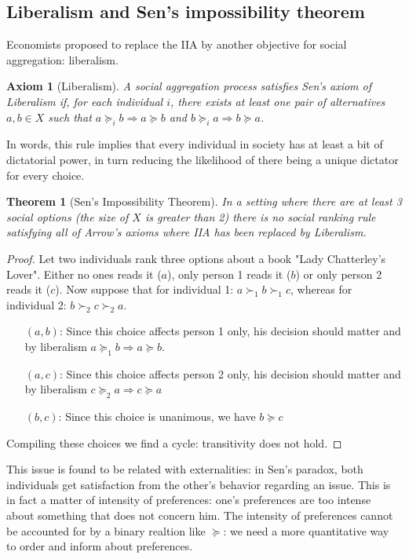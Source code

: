 \documentclass[12pt]{report}
\newtheorem{theorem}{Theorem}[chapter]
\newtheorem{axiom}{Axiom}[chapter]
\begin{document}
\subsection{Liberalism and Sen's impossibility theorem} 

Economists proposed to replace the IIA by another objective for social aggregation: liberalism.

\begin{axiom}[Liberalism] 
A social aggregation process satisfies Sen's axiom of Liberalism if, for each individual $i$, there exists at least one pair of alternatives $a,b\in X$ such that $a\succeq_i b \Rightarrow a \succeq b$ and $b\succeq_i a \Rightarrow b \succeq a$.
\end{axiom} 
In words, this rule implies that every individual in society has at least a bit of dictatorial power, in turn reducing the likelihood of there being a unique dictator for every choice.

\begin{theorem}[Sen's Impossibility Theorem]
In a setting where there are at least 3 social options (the size of $X$ is greater than 2) there is no social ranking rule satisfying all of Arrow's axioms where IIA has been replaced by Liberalism.
\end{theorem}

\begin{proof} 
Let two individuals rank three options about a book "Lady Chatterley's Lover". Either no ones reads it ($a$), only person 1 reads it ($b$) or only person 2 reads it ($c$). Now suppose that for individual 1: $a \succ_1 b \succ_1 c$, whereas for individual 2: $b \succ_2 c \succ_2 a$. \begin{itemize}
\item[$(a,b)$:] Since this choice affects person 1 only, his decision should matter and by liberalism $a\succeq_1 b \Rightarrow a \succeq b$.
\item[$(a,c)$:] Since this choice affects person 2 only, his decision should matter and by liberalism $c\succeq_2 a \Rightarrow c \succeq a$
\item[$(b,c)$:] Since this choice is unanimous, we have $b \succeq c$
\end{itemize}
Compiling these choices we find a cycle: transitivity does not hold.
\end{proof}

This issue is found to be related with externalities: in Sen's paradox, both individuals get satisfaction from the other's behavior regarding an issue. This is in fact a matter of intensity of preferences: one's preferences are too intense about something that does not concern him. The intensity of preferences cannot be accounted for by a binary realtion like $\succeq$: we need a more quantitative way to order and inform about preferences.
\end{document}
